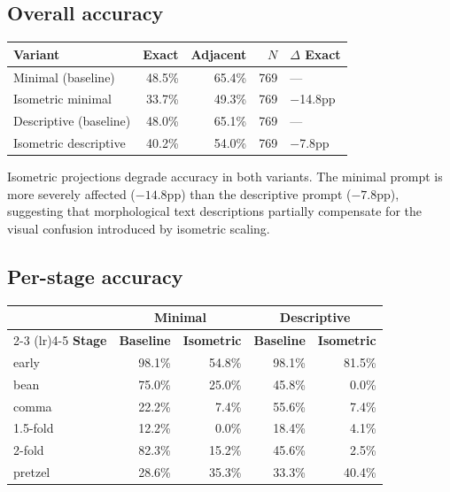 \documentclass[11pt, a4paper]{article}
\begin{document}
\subsection{Overall accuracy}

\begin{center}
\begin{tabular}{@{}lrrrl@{}}
\toprule
\textbf{Variant} & \textbf{Exact} & \textbf{Adjacent} & \textbf{$N$}
  & \textbf{$\Delta$ Exact} \\
\midrule
Minimal (baseline)       & 48.5\% & 65.4\% & 769 & --- \\
Isometric minimal        & 33.7\% & 49.3\% & 769
  & \textcolor{neg}{$-$14.8pp} \\
\addlinespace
Descriptive (baseline)   & 48.0\% & 65.1\% & 769 & --- \\
Isometric descriptive    & 40.2\% & 54.0\% & 769
  & \textcolor{neg}{$-$7.8pp} \\
\bottomrule
\end{tabular}
\end{center}

Isometric projections degrade accuracy in both variants.  The minimal prompt
is more severely affected ($-14.8$pp) than the descriptive prompt ($-7.8$pp),
suggesting that morphological text descriptions partially compensate for the
visual confusion introduced by isometric scaling.

\subsection{Per-stage accuracy}

\begin{center}
\small
\begin{tabular}{@{}l*{4}{r}@{}}
\toprule
& \multicolumn{2}{c}{\textbf{Minimal}} & \multicolumn{2}{c}{\textbf{Descriptive}} \\
\cmidrule(lr){2-3} \cmidrule(lr){4-5}
\textbf{Stage} & \textbf{Baseline} & \textbf{Isometric}
  & \textbf{Baseline} & \textbf{Isometric} \\
\midrule
early     & 98.1\% & 54.8\% & 98.1\% & 81.5\% \\
bean      & 75.0\% & 25.0\% & 45.8\% &  0.0\% \\
comma     & 22.2\% &  7.4\% & 55.6\% &  7.4\% \\
1.5-fold  & 12.2\% &  0.0\% & 18.4\% &  4.1\% \\
2-fold    & 82.3\% & 15.2\% & 45.6\% &  2.5\% \\
pretzel   & 28.6\% & 35.3\% & 33.3\% & 40.4\% \\
\bottomrule
\end{tabular}
\end{center}
\end{document}
